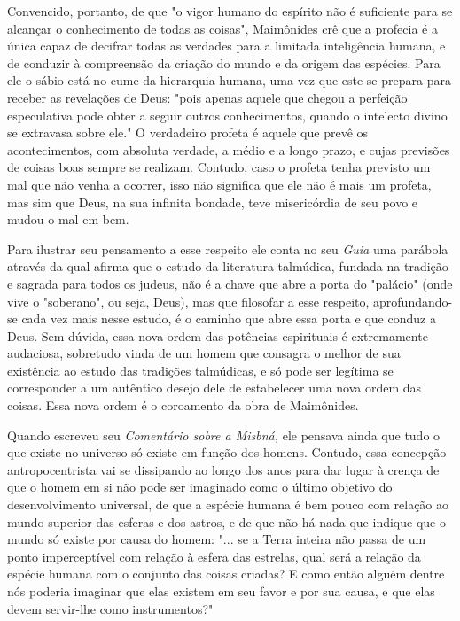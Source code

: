 \begin{itemize}
\begin{enumrate}
Convencido, portanto, de que "o vigor humano do espírito não é
suficiente para se alcançar o conhecimento de todas as coisas",
Maimônides crê que a profecia é a única capaz de decifrar todas as
verdades para a limitada inteligência humana, e de conduzir à
compreensão da criação do mundo e da origem das espécies. Para ele o
sábio está no cume da hierarquia humana, uma vez que este se prepara
para receber as revelações de Deus: "pois apenas aque­le que chegou a
perfeição especulativa pode obter a seguir outros conhecimen­tos, quando
o intelecto divino se extravasa sobre ele." O verdadeiro profeta é
aquele que prevê os acontecimentos, com absoluta verdade, a médio e a
lon­go prazo, e cujas previsões de coisas boas sempre se realizam.
Contudo, caso o profeta tenha previsto um mal que não venha a ocorrer,
isso não significa que ele não é mais um profeta, mas sim que Deus, na
sua infinita bondade, teve misericórdia de seu povo e mudou o mal em
bem.

Para ilustrar seu pensamento a esse respeito ele conta no seu
\emph{Guia} uma parábola através da qual afirma que o estudo da
literatura talmúdica, fun­dada na tradição e sagrada para todos os
judeus, não é a chave que abre a porta do "palácio" (onde vive o
"soberano", ou seja, Deus), mas que filosofar a esse respeito,
aprofundando-se cada vez mais nesse estudo, é o caminho que abre essa
porta e que conduz a Deus. Sem dúvida, essa nova ordem das potências
espirituais é extremamente audaciosa, sobretudo vinda de um homem que
con­sagra o melhor de sua existência ao estudo das tradições talmúdicas,
e só pode ser legítima se corresponder a um autêntico desejo dele de
estabelecer uma no­va ordem das coisas. Essa nova ordem é o coroamento
da obra de Maimônides.

Quando escreveu seu \emph{Comentário sobre a Misbná,} ele pensava ain­da
que tudo o que existe no universo só existe em função dos homens.
Contu­do, essa concepção antropocentrista vai se dissipando ao longo dos
anos para dar lugar à crença de que o homem em si não pode ser imaginado
como o últi­mo objetivo do desenvolvimento universal, de que a espécie
humana é bem pouco com relação ao mundo superior das esferas e dos
astros, e de que não há nada que indique que o mundo só existe por causa
do homem: "... se a Ter­ra inteira não passa de um ponto imperceptível
com relação à esfera das estre­las, qual será a relação da espécie
humana com o conjunto das coisas criadas? E como então alguém dentre nós
poderia imaginar que elas existem em seu fa­vor e por sua causa, e que
elas devem servir-lhe como instrumentos?"


\end{enumrate}
\end{itemize}
